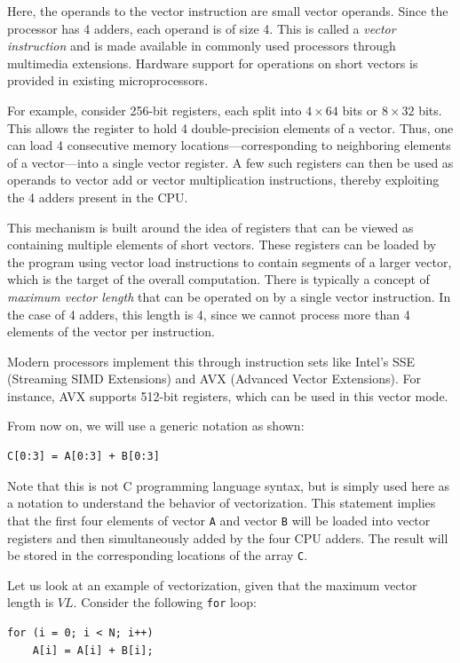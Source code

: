 \documentclass[12pt]{book}
\begin{document}
Here, the operands to the vector instruction are small vector operands. Since the processor has 4 adders, each operand is of size 4. This is called a \textit{vector instruction} and is made available in commonly used processors through multimedia extensions. Hardware support for operations on short vectors is provided in existing microprocessors.

For example, consider 256-bit registers, each split into $4 \times 64$ bits or $8 \times 32$ bits. This allows the register to hold 4 double-precision elements of a vector. Thus, one can load 4 consecutive memory locations—corresponding to neighboring elements of a vector—into a single vector register. A few such registers can then be used as operands to vector add or vector multiplication instructions, thereby exploiting the 4 adders present in the CPU.

This mechanism is built around the idea of registers that can be viewed as containing multiple elements of short vectors. These registers can be loaded by the program using vector load instructions to contain segments of a larger vector, which is the target of the overall computation. There is typically a concept of \textit{maximum vector length} that can be operated on by a single vector instruction. In the case of 4 adders, this length is 4, since we cannot process more than 4 elements of the vector per instruction.

Modern processors implement this through instruction sets like Intel’s SSE (Streaming SIMD Extensions) and AVX (Advanced Vector Extensions). For instance, AVX supports 512-bit registers, which can be used in this vector mode.

From now on, we will use a generic notation as shown:
\begin{lstlisting}[style=cppstyle]
C[0:3] = A[0:3] + B[0:3]
\end{lstlisting}

Note that this is not C programming language syntax, but is simply used here as a notation to understand the behavior of vectorization. This statement implies that the first four elements of vector \texttt{A} and vector \texttt{B} will be loaded into vector registers and then simultaneously added by the four CPU adders. The result will be stored in the corresponding locations of the array \texttt{C}.

Let us look at an example of vectorization, given that the maximum vector length is $VL$. Consider the following \texttt{for} loop:

\begin{lstlisting}[style=cppstyle]
for (i = 0; i < N; i++)
    A[i] = A[i] + B[i];
\end{lstlisting}
\end{document}
